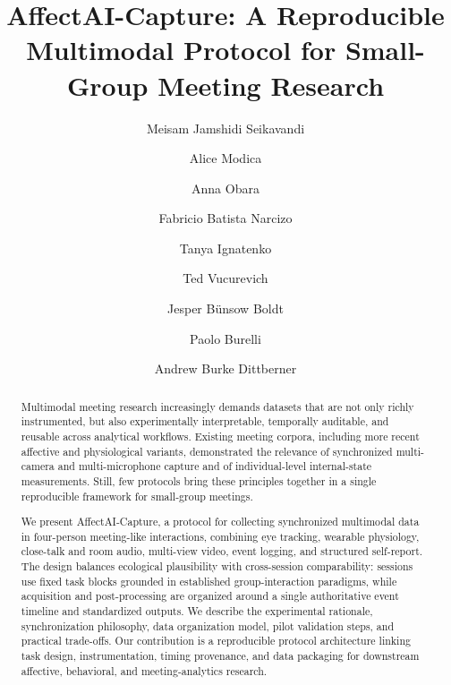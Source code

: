 \documentclass[runningheads]{llncs}
\begin{document}
\pagestyle{empty}
\newcommand{\subhead}[1]{\par\vspace{3pt}\noindent\textbf{#1.}\ }
\title{AffectAI-Capture: A Reproducible Multimodal Protocol for Small-Group Meeting Research}


\author{
Meisam Jamshidi Seikavandi \and
Alice Modica \and
Anna Obara \and
Fabricio Batista Narcizo \and
Tanya Ignatenko \and
Ted Vucurevich \and
Jesper Bünsow Boldt  \and
Paolo Burelli \and
Andrew Burke Dittberner
}



\maketitle

\begin{abstract}
Multimodal meeting research increasingly demands datasets that are not only richly instrumented, but also experimentally interpretable, temporally auditable, and reusable across analytical workflows. Existing meeting corpora, including more recent affective and physiological variants, demonstrated the relevance of synchronized multi-camera and multi-microphone capture and of individual-level internal-state measurements. Still, few protocols bring these principles together in a single reproducible framework for small-group meetings.

We present AffectAI-Capture, a protocol for collecting synchronized multimodal data in four-person meeting-like interactions, combining eye tracking, wearable physiology, close-talk and room audio, multi-view video, event logging, and structured self-report. The design balances ecological plausibility with cross-session comparability: sessions use fixed task blocks grounded in established group-interaction paradigms, while acquisition and post-processing are organized around a single authoritative event timeline and standardized outputs. We describe the experimental rationale, synchronization philosophy, data organization model, pilot validation steps, and practical trade-offs. Our contribution is a reproducible protocol architecture linking task design, instrumentation, timing provenance, and data packaging for downstream affective, behavioral, and meeting-analytics research.
\end{abstract}
\end{document}
